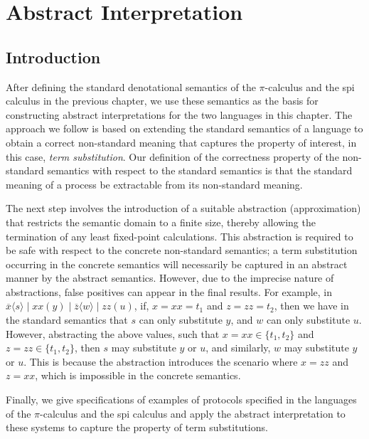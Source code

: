 \documentclass[10pt,a4paper,final,oneside,fleqn]{book}
\begin{document}
\chapter{Abstract Interpretation} %
\section{Introduction}
After defining the standard denotational semantics of the $\pi$-calculus and the spi calculus in the previous chapter, we use these semantics as the basis for constructing abstract interpretations for the two languages in this chapter.  The approach we follow is based on extending the standard semantics of a language to obtain a correct non-standard meaning that captures the property of interest, in this case, {\itshape term substitution\/}. Our definition of the correctness property of the non-standard semantics with respect to the standard semantics is that the standard meaning of a process be extractable from its non-standard meaning.

The next step involves the introduction of a suitable abstraction (approximation) that restricts the semantic domain to a finite size, thereby allowing the termination of any least fixed-point calculations.  This abstraction is required to be safe with respect to the concrete non-standard semantics; a term substitution occurring in the concrete semantics will necessarily be captured in an abstract manner by the abstract semantics.  However, due to the imprecise nature of abstractions, false positives can appear in the final results.  For example, in $\overline{x}\langle s\rangle\mid xx(y)\mid\overline{z}\langle w\rangle\mid zz(u)$, if, $x=xx=t_1$ and $z=zz=t_2$, then we have in the standard semantics that $s$ can only substitute $y$, and $w$ can only substitute $u$.  However, abstracting the above values, such that $x=xx\in\{t_1,t_2\}$ and $z=zz\in\{t_1,t_2\}$, then $s$ may substitute $y$ or $u$, and similarly, $w$ may substitute $y$ or $u$. This is because the abstraction introduces the scenario where $x=zz$ and $z=xx$, which is impossible in the concrete semantics.

Finally, we give specifications of examples of protocols specified in the languages of the $\pi$-calculus and the spi calculus and apply the abstract interpretation to these systems to capture the property of term substitutions.
\end{document}
